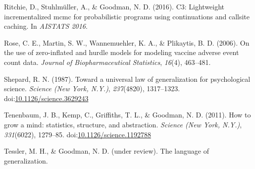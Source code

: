 \documentclass[floatsintext,man]{apa6}
\theoremstyle{definition}
\theoremstyle{definition}
\theoremstyle{definition}
\theoremstyle{remark}
\begin{document}
\hypertarget{ref-Ritchie2016}{}
Ritchie, D., Stuhlmüller, A., \& Goodman, N. D. (2016). C3: Lightweight
incrementalized mcmc for probabilistic programs using continuations and
callsite caching. In \emph{AISTATS 2016}.

\hypertarget{ref-hurdleModels}{}
Rose, C. E., Martin, S. W., Wannemuehler, K. A., \& Plikaytis, B. D.
(2006). On the use of zero-inflated and hurdle models for modeling
vaccine adverse event count data. \emph{Journal of Biopharmaceutical
Statistics}, \emph{16}(4), 463--481.

\hypertarget{ref-Shepard1987}{}
Shepard, R. N. (1987). Toward a universal law of generalization for
psychological science. \emph{Science (New York, N.Y.)},
\emph{237}(4820), 1317--1323.
doi:\href{https://doi.org/10.1126/science.3629243}{10.1126/science.3629243}

\hypertarget{ref-Tenenbaum2011}{}
Tenenbaum, J. B., Kemp, C., Griffiths, T. L., \& Goodman, N. D. (2011).
How to grow a mind: statistics, structure, and abstraction.
\emph{Science (New York, N.Y.)}, \emph{331}(6022), 1279--85.
doi:\href{https://doi.org/10.1126/science.1192788}{10.1126/science.1192788}

\hypertarget{ref-TesslerLangGenUnderReview}{}
Tessler, M. H., \& Goodman, N. D. (under review). The language of
generalization.
\end{document}
